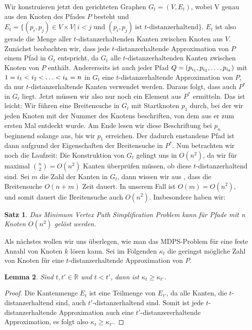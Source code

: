 \documentclass[11pt]{article}
\newcommand{\R}{\mathbb{R}}
\newtheorem{theorem}{Satz}[section]
\newtheorem{lemma}[theorem]{Lemma}
\begin{document}
    Wir konstruieren jetzt den gerichteten Graphen $G_t = (V,E_t)$, wobei V genau aus den Knoten des Pfades $P$ besteht und 
    $E_t = \{(p_i, p_j) \in V\times V|\ i < j \text{ und } (p_i,p_j)\ \text{ist $t$-distanzerhaltend}\}$. $E_t$ ist also gerade die Menge aller $t$-distanzerhaltenden Kanten zwischen Knoten aus $V$. Zunächst beobachten wir, dass jede $t$-distanzerhaltende Approximation von $P$ einem Pfad in $G_t$ entspricht, da $G_t$ alle $t$-distanzerhaltenden Kanten zwischen Knoten von $P$ enthält. Andererseits ist auch jeder Pfad $Q = (p_{i_1}, p_{i_2}, \mathellipsis, p_{i_k})$ mit $1 = i_1 < i_2 < \mathellipsis < i_k = n$ in $G_t$ eine $t$-distanzerhaltende Approximation von $P$, da nur $t$-distanzerhaltende Kanten verwendet werden. Daraus folgt, dass auch $P^*$ in $G_t$ liegt. Jetzt müssen wir also nur noch ein Element aus $P^*$ ermitteln. Das ist leicht: Wir führen eine Breitensuche in $G_t$ mit Startknoten $p_1$ durch, bei der wir jeden Knoten mit der Nummer des Knotens beschriften, von dem aus er zum ersten Mal entdeckt wurde. Am Ende lesen wir diese Beschriftung bei $p_n$ beginnend solange aus, bis wir $p_1$ erreichen. Der dadurch enstandene Pfad ist dann aufgrund der Eigenschaften der Breitensuche in $P^*$. 
    Nun betrachten wir noch die Laufzeit: Die Konstruktion von $G_t$ gelingt uns in $O(n^2)$, da wir für maximal $\binom{n}{2} = O(n^2)$ Kanten überprüfen müssen, ob diese $t$-distanzerhaltend sind. Sei $m$ die Zahl der Kanten in $G_t$, dann wissen wir aus  \cite{hagerup}, dass die Breitensuche $O(n+m)$ Zeit dauert. In unserem Fall ist $O(m) = O(n^2)$, und somit dauert die Breitensuche auch $O(n^2)$. Insbesondere haben wir:
    \begin{theorem}
    	\label{theo:mvpsex}
    	Das Minimum Vertex Path Simplification Problem kann für Pfade mit n Knoten $O(n^2)$ gelöst werden.
    \end{theorem} 
    
    Als nächstes wollen wir uns überlegen, wie man das MDPS-Problem für eine feste Anzahl von Knoten $k$ lösen kann. Sei im Folgenden $\kappa_t$ die geringst mögliche Zahl von Knoten für eine $t$-distanzerhaltende Approximation von $P$.
	\begin{lemma}
		\label{lem:kappa}
		Sind $t, t' \in \R$ und $t < t'$, dann ist $\kappa_t \geq \kappa_{t'}$.
	\end{lemma}
	\begin{proof}
		Die Kantenmenge $E_t$ ist eine Teilmenge von $E_{t'}$, da alle Kanten, die $t$-distanzerhaltend sind, auch $t'$-distanzerhaltend sind. Somit ist jede $t$-distanzerhaltende Approximation auch eine $t'$-distanzererhaltende Approximation, es folgt also $\kappa_t \geq \kappa_{t'}$.
	\end{proof}
	
\end{document}
